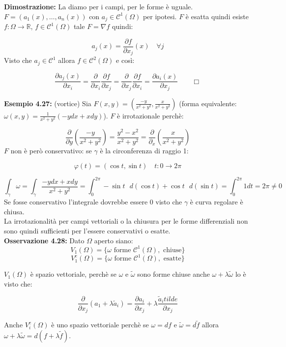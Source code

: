 \documentclass[a4paper,11pt,titlepage]{book}
\begin{document}
\textbf{Dimostrazione:} La diamo per i campi, per le forme è uguale. $F=(a_1(x),\ldots,a_n(x))$ con $a_j\in\mathcal{C}^1(\Omega)$ per ipotesi. $F$ è esatta quindi esiste $f:\Omega\to\mathbb{R}$, $f\in\mathcal{C}^1(\Omega)$ tale $F=\nabla f$ quindi:

$$a_j(x)=\frac{\partial f}{\partial x_j}(x)\quad\forall j$$
Visto che $a_j\in\mathcal{C}^1$ allora $f\in\mathcal{C}^2(\Omega)$ e così:

$$\frac{\partial a_j(x)}{\partial x_i}=\frac{\partial}{\partial x_i}\frac{\partial f}{\partial x_j}=\frac{\partial}{\partial x_j}\frac{\partial f}{\partial x_i}=\frac{\partial a_i(x)}{\partial x_j}\qquad\Box$$

\textbf{Esempio 4.27: } (vortice) Sia $F(x,y)=\left(\frac{-y}{x^2+y^2},\frac{x}{x^2+y^2}\right)$ (forma equivalente: $\omega(x,y)=\frac{1}{x^2+y^2}(-ydx+xdy)$). $F$ è irrotazionale perchè:

$$\frac{\partial}{\partial y}\left(\frac{-y}{x^2+y^2}\right)=\frac{y^2-x^2}{x^2+y^2}=\frac{\partial}{\partial_x}\left(\frac{x}{x^2+y^2}\right)$$
$F$ non è però conservativo: se $\gamma$ è la circonferenza di raggio 1:

$$\varphi(t)=(\cos t,\sin t) \quad t:0\to 2\pi$$ 

$$\int_\gamma\omega=\int_\gamma \frac{-ydx+xdy}{x^2+y^2}=\int_0^{2\pi}-\sin t\mbox{ }d(\cos t)+\cos t\mbox{ }d(\sin t)=\int_0^{2\pi}1dt=2\pi\ne 0$$
Se fosse conservativo l'integrale dovrebbe essere 0 visto che $\gamma$ è curva regolare è chiusa.\\

La irrotazionalità per campi vettoriali o la chiusura per le forme differenziali non sono quindi sufficienti per l'essere conservativi o esatte.\\

\textbf{Osservazione 4.28: }Dato $\Omega$ aperto siano:
$$V_1(\Omega)=\{\omega\mbox{ forme }\mathcal{C}^1(\Omega),\mbox{ chiuse}\}$$
$$V_1^e(\Omega)=\{\omega\mbox{ forme }\mathcal{C}^1(\Omega),\mbox{ esatte}\}$$

$V_1(\Omega)$ è spazio vettoriale, perchè se $\omega$ e $\tilde\omega$ sono forme chiuse anche $\omega+\lambda\tilde\omega$ lo è visto che:

$$\frac{\partial}{\partial x_j}(a_1+\lambda\tilde{a}_i)=\frac{\partial a_i}{\partial x_j}+\lambda\frac{\tilde{a}_itilde}{\partial x_j}$$

Anche $V_i^e(\Omega)$ è uno spazio vettoriale perchè se $\omega=df$ e $\tilde{\omega}=d\tilde{f}$ allora $\omega+\lambda\tilde{\omega}=d(f+\lambda\tilde{f})$.
\end{document}
